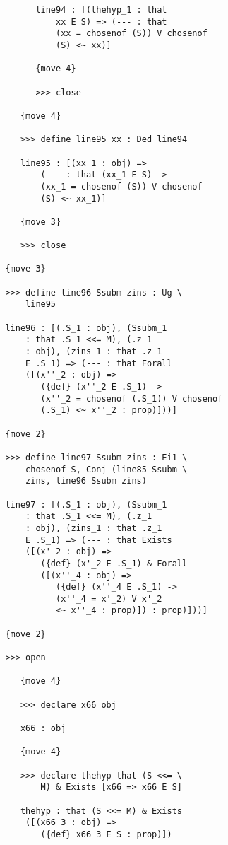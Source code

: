 \documentclass{article}
\begin{document}
\begin{verbatim}
               line94 : [(thehyp_1 : that 
                   xx E S) => (--- : that 
                   (xx = chosenof (S)) V chosenof 
                   (S) <~ xx)]

               {move 4}

               >>> close

            {move 4}

            >>> define line95 xx : Ded line94

            line95 : [(xx_1 : obj) => 
                (--- : that (xx_1 E S) -> 
                (xx_1 = chosenof (S)) V chosenof 
                (S) <~ xx_1)]

            {move 3}

            >>> close

         {move 3}

         >>> define line96 Ssubm zins : Ug \
             line95

         line96 : [(.S_1 : obj), (Ssubm_1 
             : that .S_1 <<= M), (.z_1 
             : obj), (zins_1 : that .z_1 
             E .S_1) => (--- : that Forall 
             ([(x''_2 : obj) => 
                ({def} (x''_2 E .S_1) -> 
                (x''_2 = chosenof (.S_1)) V chosenof 
                (.S_1) <~ x''_2 : prop)]))]

         {move 2}

         >>> define line97 Ssubm zins : Ei1 \
             chosenof S, Conj (line85 Ssubm \
             zins, line96 Ssubm zins)

         line97 : [(.S_1 : obj), (Ssubm_1 
             : that .S_1 <<= M), (.z_1 
             : obj), (zins_1 : that .z_1 
             E .S_1) => (--- : that Exists 
             ([(x'_2 : obj) => 
                ({def} (x'_2 E .S_1) & Forall 
                ([(x''_4 : obj) => 
                   ({def} (x''_4 E .S_1) -> 
                   (x''_4 = x'_2) V x'_2 
                   <~ x''_4 : prop)]) : prop)]))]

         {move 2}

         >>> open

            {move 4}

            >>> declare x66 obj

            x66 : obj

            {move 4}

            >>> declare thehyp that (S <<= \
                M) & Exists [x66 => x66 E S]

            thehyp : that (S <<= M) & Exists 
             ([(x66_3 : obj) => 
                ({def} x66_3 E S : prop)])


\end{verbatim}
\end{document}
